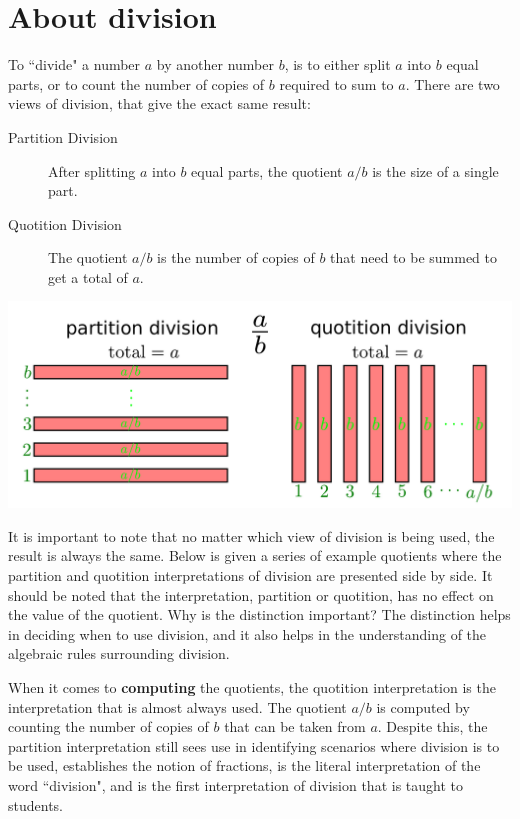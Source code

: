 \documentclass{article}
\begin{document}
\section*{About division}

To ``divide" a number \(a\) by another number \(b\), is to either split \(a\) into \(b\) equal parts, or to count the number of copies of \(b\) required to sum to \(a\). There are two views of division, that give the exact same result:

\begin{description}
\item[Partition Division] After splitting \(a\) into \(b\) equal parts, the quotient \(a/b\) is the size of a single part. 
\item[Quotition Division] The quotient \(a/b\) is the number of copies of \(b\) that need to be summed to get a total of \(a\).
\end{description}

\includegraphics[width = \textwidth]{two_approaches_to_division}

It is important to note that no matter which view of division is being used, the result is always the same. Below is given a series of example quotients where the partition and quotition interpretations of division are presented side by side. It should be noted that the interpretation, partition or quotition, has no effect on the value of the quotient. Why is the distinction important? The distinction helps in deciding when to use division, and it also helps in the understanding of the algebraic rules surrounding division. 

When it comes to {\bf computing} the quotients, the quotition interpretation is the interpretation that is almost always used. The quotient \(a/b\) is computed by counting the number of copies of \(b\) that can be taken from \(a\). Despite this, the partition interpretation still sees use in identifying scenarios where division is to be used, establishes the notion of fractions, is the literal interpretation of the word ``division", and is the first interpretation of division that is taught to students.
\end{document}
